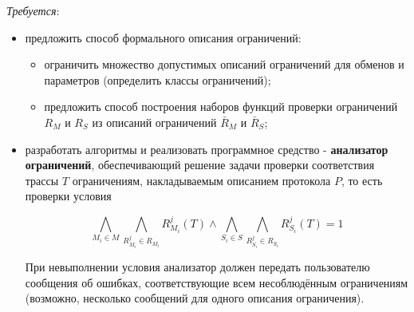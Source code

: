 \textit{Требуется}: 

\begin{itemize}
 \item предложить способ формального описания ограничений:
 \begin{itemize}
  \item ограничить множество допустимых описаний ограничений для обменов и 
параметров (определить классы ограничений);
  \item предложить способ построения наборов функций проверки ограничений 
$R_M$ и $R_S$ из описаний ограничений $\bar{R}_M$ и $\bar{R}_S$;
 \end{itemize}
 \item разработать алгоритмы и реализовать программное средство - 
\textbf{анализатор ограничений}, обеспечивающий решение задачи проверки 
соответствия трассы $T$ ограничениям, накладываемым описанием протокола $P$, то 
есть проверки условия

$$\bigwedge\limits_{M_i \in M} \bigwedge\limits_{R_{M_i}^j \in R_{M_i}} 
R_{M_i}^j(T) \wedge \bigwedge\limits_{S_i \in S} \bigwedge\limits_{R_{S_i}^j 
\in R_{S_i}} R_{S_i}^j(T) = 1$$

При невыполнении условия анализатор должен передать пользователю сообщения об 
ошибках, соответствующие всем несоблюдённым ограничениям (возможно, несколько 
сообщений для одного описания ограничения).
\end{itemize}